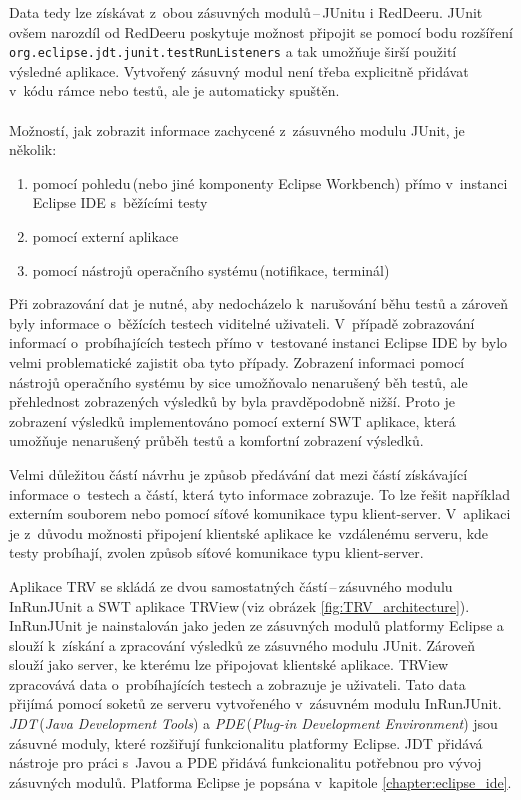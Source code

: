   Data tedy lze získávat z~obou zásuvných modulů\,--\,JUnitu i RedDeeru. JUnit ovšem narozdíl od RedDeeru poskytuje možnost připojit se pomocí bodu rozšíření \texttt{org.ecli\-pse.jdt.ju\-nit.test\-Run\-Listeners} a tak umožňuje širší použití výsledné aplikace. Vytvořený zásuvný modul není třeba explicitně přidávat v~kódu rámce nebo testů, ale je automaticky spuštěn.
  \\
  \\\noindent
  Možností, jak zobrazit informace zachycené z~zásuvného modulu JUnit, je několik:
  \begin{enumerate}
   \item pomocí pohledu\,(nebo jiné komponenty Eclipse Workbench) přímo v~instanci Eclipse IDE s~běžícími testy
   \item pomocí externí aplikace
   \item pomocí nástrojů operačního systému\,(notifikace, terminál)
  \end{enumerate}

  \noindent
  Při zobrazování dat je nutné, aby nedocházelo k~narušování běhu testů a zároveň byly informace o~běžících testech viditelné uživateli. V~případě zobrazování informací o~probíhajících testech přímo v~testované instanci Eclipse IDE by bylo velmi problematické zajistit oba tyto případy. Zobrazení informaci pomocí nástrojů operačního systému by sice umožňovalo nenarušený běh testů, ale přehlednost zobrazených výsledků by byla pravděpodobně nižší. Proto je zobrazení výsledků implementováno pomocí externí SWT aplikace, která umožňuje nenarušený průběh testů a komfortní zobrazení výsledků.

  Velmi důležitou částí návrhu je způsob předávání dat mezi částí získávající informace o~testech a částí, která tyto informace zobrazuje. To lze řešit například externím souborem nebo pomocí síťové komunikace typu klient-server. V~aplikaci je z~důvodu možnosti připojení klientské aplikace ke~vzdálenému serveru, kde testy probíhají, zvolen způsob síťové komunikace typu klient-server.

  Aplikace TRV se skládá ze dvou samostatných částí\,--\,zásuvného modulu InRunJUnit a SWT aplikace TRView\,(viz obrázek \ref{fig:TRV_architecture}). InRunJUnit je nainstalován jako jeden ze zásuvných modulů platformy Eclipse a slouží k~získání a zpracování výsledků ze zásuvného modulu JUnit. Zároveň slouží jako server, ke kterému lze připojovat klientské aplikace. TRView zpracovává data o~probíhajících testech a zobrazuje je uživateli. Tato data přijímá pomocí soketů ze serveru vytvořeného v~zásuvném modulu InRunJUnit. \emph{JDT}\,(\emph{Java Development Tools}) a \emph{PDE}\,(\emph{Plug-in Development Environment}) jsou zásuvné moduly, které rozšiřují funkcionalitu platformy Eclipse. JDT přidává nástroje pro práci s~Javou a PDE přidává funkcionalitu potřebnou pro vývoj zásuvných modulů. Platforma Eclipse je popsána v~kapitole \ref{chapter:eclipse_ide}.

